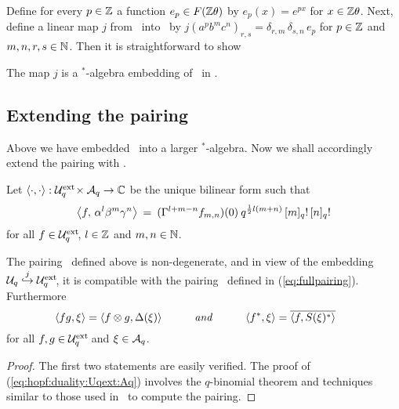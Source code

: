 Define for every $p\in \ZZ$ a function $e_p \in \FZ$ by
$e_p(x)=e^{px}$ for $x\in\Zt$. Next, define a linear map $j$
from \Uq\ into \Uqext\ by
$j(a^p b^m c^n)_{r,s} = \delta_{r,m}\, \delta_{s,n}\, e_p$
for $p \in \ZZ$ and $m,n,r,s \in \NN$.
Then it is straightforward to show

\begin{lemma}  \label{lemma:embedding:Uq}
  The map\/ $j$ is a $^*$-algebra embedding of\/ \Uq\ in\/ \Uqext.
\end{lemma}



\subsection{Extending the pairing}
Above we have embedded \Uq\ into a larger $^*$-algebra.
Now we shall accordingly extend the pairing with \Aq.

\begin{defn} \label{def:pairing:Uqext:Aq}
Let $\pairing : \Uqext \times \Aq \rarr \kk$ be the unique bilinear form such that
 \begin{equation} \label{eq:pairing:Uqext:Aq}
   \pairM{f}{\alpha^l \beta^m \gamma^n}
       \:=\:
   (\Gamma^{l+m-n} f_{m,n})(0) \: q^{\frac{1}{2}l(m+n)} \,\qfac{m}\, \qfac{n}
 \end{equation}
for all $f \in \Uqext$, $l \in \ZZ$ and $m,n \in \NN$.
\end{defn}



\begin{prop} \label{prop:pairing:Uqext:Aq}
  The pairing\/ \UqextAq\ defined above is non-degenerate, and
  in view of the embedding\/  $\Uq \stackrel{j}{\hookrightarrow} \Uqext$,
  it is compatible with the pairing\/ \UqAq\ defined in (\ref{eq:fullpairing}).
  Furthermore
  \begin{equation}\label{eq:hopf:duality:Uqext:Aq}
     \pair{fg}{\xi}  = \pair{f \tens g}{\Delta(\xi)}  \itandspace{3em}
     \pair{f^*}{\xi} = \overline{\pair{f}{S(\xi)^*}}  \hspace{1.5em}
  \end{equation}
for all\/ $f,g \in\Uqext$ and\/ $\xi \in \Aq$.
\end{prop}

\begin{proof}
The first two statements are easily verified.
The proof of (\ref{eq:hopf:duality:Uqext:Aq}) involves the
$q$-binomial theorem and techniques similar to those
used in \cite{Koelink:thesis,Koelink:QE2}\ to compute the pairing.
\end{proof}
\vspace{2ex}


